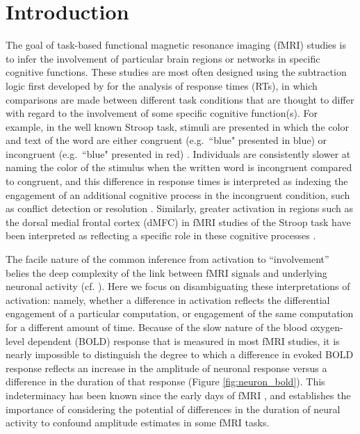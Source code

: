 \documentclass[titlepage,12pt] {article}
\begin{document}
\section*{Introduction}

The goal of task-based functional magnetic resonance imaging (fMRI) studies is to infer the involvement of particular brain regions or networks in specific cognitive functions.  These studies are most often designed using the subtraction logic first developed by \citet{donders1969} for the analysis of response times (RTs), in which comparisons are made between different task conditions that are thought to differ with regard to the involvement of some specific cognitive function(s).  For example, in the well known Stroop task, stimuli are presented in which the color and text of the word are either congruent (e.g.\ ``blue" presented in blue) or incongruent (e.g.\ ``blue" presented in red) \citep{stroop_1935}.  Individuals are consistently slower at naming the color of the stimulus when the written word is incongruent compared to congruent, and this difference in response times is interpreted as indexing the engagement of an additional cognitive process in the incongruent condition, such as conflict detection or resolution \citep{botvinick2001}. Similarly, greater activation in regions such as the dorsal medial frontal cortex (dMFC) in fMRI studies of the Stroop task have been interpreted as reflecting a specific role in these cognitive processes \citep{botvinick1999, macdonald2000, kernsAnteriorCingulateConflict2004}.  

The facile nature of the common inference from activation to ``involvement'' belies the deep complexity of the link between fMRI signals and underlying neuronal activity (cf. \citet{logothetisWhatWeCan2008}).  Here we focus on disambiguating these interpretations of activation: namely, whether a difference in activation reflects the differential engagement of a particular computation, or engagement of the same computation for a different amount of time.  Because of the slow nature of the blood oxygen-level dependent (BOLD) response that is measured in most fMRI studies, it is nearly impossible to distinguish the degree to which a difference in evoked BOLD response reflects an increase in the amplitude of neuronal response versus a difference in the duration of that response (Figure \ref{fig:neuron_bold}).  This indeterminacy has been known since the early days of fMRI \citep{savoy1995, fslbook2001}, and establishes the importance of considering the potential of differences in the duration of neural activity to confound amplitude estimates in some fMRI tasks.  
\end{document}
